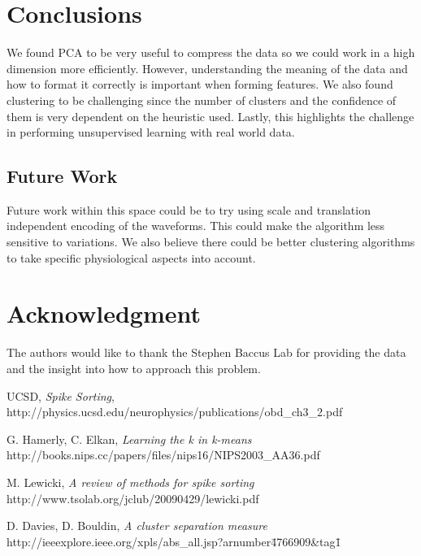 \documentclass[conference]{IEEEtran}
\begin{document}
\section{Conclusions}
We found PCA to be very useful to compress the data so we could work
in a high dimension more efficiently. However, understanding the
meaning of the data and how to format it correctly is important when
forming features. We also found clustering to be challenging since the
number of clusters and the confidence of them is very dependent on the
heuristic used.  Lastly, this highlights the challenge in performing
unsupervised learning with real world data.

\subsection{Future Work}
Future work within this space could be to try using scale and
translation independent encoding of the waveforms. This could make the
algorithm less sensitive to variations.  We also believe there could
be better clustering algorithms to take specific physiological 
aspects into account.


\section*{Acknowledgment}
The authors would like to thank the Stephen Baccus Lab for providing
the data and the insight into how to approach this problem.


\begin{thebibliography}{1}


UCSD, \emph{Spike Sorting},
http://physics.ucsd.edu/neurophysics/publications/obd\_ch3\_2.pdf

G. Hamerly, C. Elkan, \emph{Learning the k in k-means}
http://books.nips.cc/papers/files/nips16/NIPS2003\_AA36.pdf

M. Lewicki, \emph{A review of methods for spike sorting}
http://www.tsolab.org/jclub/20090429/lewicki.pdf

D. Davies, D. Bouldin, \emph{A cluster separation measure}
http://ieeexplore.ieee.org/xpls/abs\_all.jsp?arnumber\=4766909\&tag\=1


\end{thebibliography}
\end{document}
